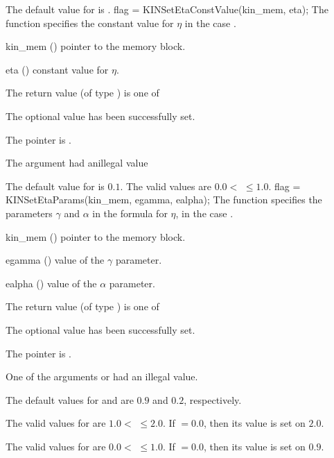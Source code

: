 {
  The default value for  is .
}
{
flag = KINSetEtaConstValue(kin\_mem, eta);
}
{
  The function  specifies the constant value
  for $\eta$ in the case .
}
{
  \begin{args}
  \item[kin\_mem] ()
    pointer to the {\kinsol} memory block.
  \item[eta] ()
    constant value for $\eta$.
  \end{args}
}
{
  The return value  (of type ) is one of
  \begin{args}
  \item[\Id{KIN\_SUCCESS}] 
    The optional value has been successfully set.
  \item[\Id{KIN\_MEM\_NULL}]
    The  pointer is .
  \item[\Id{KIN\_ILL\_INPUT}]
    The argument  had anillegal value
  \end{args}
}
{
  The default value for  is $0.1$.
  The valid values are $0.0 <$  $\le 1.0$.
}
{
flag = KINSetEtaParams(kin\_mem, egamma, ealpha);
}
{
  The function  specifies the parameters $\gamma$ and
  $\alpha$ in the formula for $\eta$, in the case .
}
{
  \begin{args}
  \item[kin\_mem] ()
    pointer to the {\kinsol} memory block.
  \item[egamma] ()
    value of the $\gamma$ parameter.
  \item[ealpha] ()
    value of the $\alpha$ parameter.
  \end{args}
}
{
  The return value  (of type ) is one of
  \begin{args}
  \item[\Id{KIN\_SUCCESS}] 
    The optional value has been successfully set.
  \item[\Id{KIN\_MEM\_NULL}]
    The  pointer is .
  \item[\Id{KIN\_ILL\_INPUT}]
    One of the arguments  or  had an illegal value.
  \end{args}
}
{
  The default values for  and  are $0.9$ and $0.2$, respectively.

  The valid values for  are $1.0<$  $\le 2.0$. 
  If  $= 0.0$, then its value is set on $2.0$.

  The valid values for  are $0.0 <$  $\le1.0$.
  If  $= 0.0$, then its value is set on $0.9$.
}
